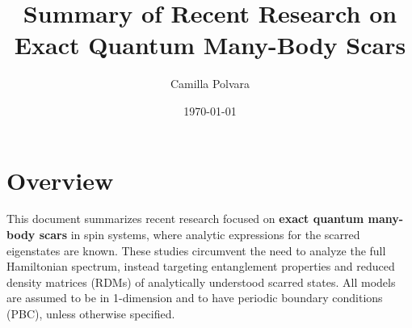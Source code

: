 \documentclass[11pt]{article}
\title{Summary of Recent Research on Exact Quantum Many-Body Scars}
\author{Camilla Polvara}
\date{\today}
\begin{document}
\maketitle

\section*{Overview}

This document summarizes recent research focused on \textbf{exact quantum many-body scars} in spin systems, where analytic expressions for the scarred eigenstates are known. These studies circumvent the need to analyze the full Hamiltonian spectrum, instead targeting entanglement properties and reduced density matrices (RDMs) of analytically understood scarred states. All models are assumed to be in 1-dimension and to have periodic boundary conditions (PBC), unless otherwise specified.

\vspace{0.5cm}
\end{document}
